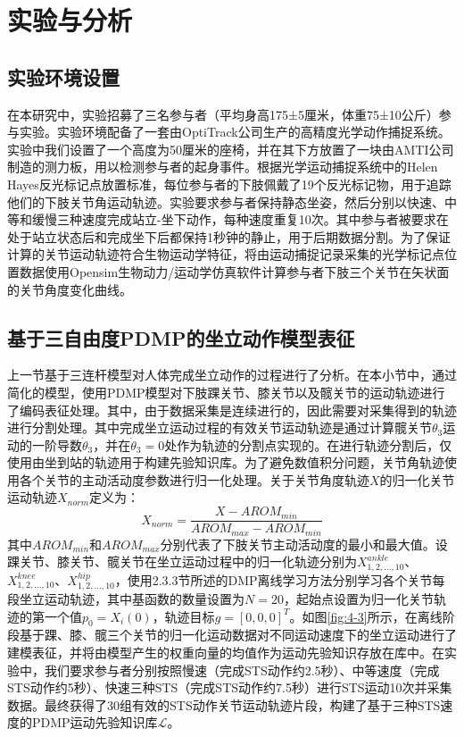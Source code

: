 \section{实验与分析}
\subsection{实验环境设置} 
在本研究中，实验招募了三名参与者（平均身高175±5厘米，体重75±10公斤）参与实验。实验环境配备了一套由OptiTrack公司生产的高精度光学动作捕捉系统。实验中我们设置了一个高度为50厘米的座椅，并在其下方放置了一块由AMTI公司制造的测力板，用以检测参与者的起身事件。根据光学运动捕捉系统中的Helen Hayes反光标记点放置标准，每位参与者的下肢佩戴了19个反光标记物，用于追踪他们的下肢关节角运动轨迹。实验要求参与者保持静态坐姿，然后分别以快速、中等和缓慢三种速度完成站立-坐下动作，每种速度重复10次。其中参与者被要求在处于站立状态后和完成坐下后都保持1秒钟的静止，用于后期数据分割。为了保证计算的关节运动轨迹符合生物运动学特征，将由运动捕捉记录采集的光学标记点位置数据使用Opensim生物动力/运动学仿真软件计算参与者下肢三个关节在矢状面的关节角度变化曲线。

\subsection{基于三自由度PDMP的坐立动作模型表征} 
上一节基于三连杆模型对人体完成坐立动作的过程进行了分析。在本小节中，通过简化的模型，使用PDMP模型对下肢踝关节、膝关节以及髋关节的运动轨迹进行了编码表征处理。其中，由于数据采集是连续进行的，因此需要对采集得到的轨迹进行分割处理。其中完成坐立运动过程的有效关节运动轨迹是通过计算髋关节$\theta_3$运动的一阶导数$\dot\theta_3$，并在$\dot\theta_3=0$处作为轨迹的分割点实现的。在进行轨迹分割后，仅使用由坐到站的轨迹用于构建先验知识库。为了避免数值积分问题，关节角轨迹使用各个关节的主动活动度参数进行归一化处理。关于关节角度轨迹$X$的归一化关节运动轨迹$X_{norm}$定义为：
\begin{equation}
    X_{norm} = \frac{X-AROM_{min}}{AROM_{max}-AROM_{min}}
    \label{eq:4-39}
\end{equation}
其中$AROM_{min}$和$AROM_{max}$分别代表了下肢关节主动活动度的最小和最大值。设踝关节、膝关节、髋关节在坐立运动过程中的归一化轨迹分别为$X_{1,2,...,10}^{ankle}$、$X_{1,2,...,10}^{knee}$、$X_{1,2,...,10}^{hip}$，使用2.3.3节所述的DMP离线学习方法分别学习各个关节每段坐立运动轨迹，其中基函数的数量设置为$N=20$，起始点设置为归一化关节轨迹的第一个值$p_0=X_i(0)$，轨迹目标$g=[0,0,0]^T$。如图\ref{fig:4-3}所示，在离线阶段基于踝、膝、髋三个关节的归一化运动数据对不同运动速度下的坐立运动进行了建模表征，并将由模型产生的权重向量的均值作为运动先验知识存放在库中。在实验中，我们要求参与者分别按照慢速（完成STS动作约2.5秒）、中等速度（完成STS动作约5秒）、快速三种STS（完成STS动作约7.5秒）进行STS运动10次并采集数据。最终获得了30组有效的STS动作关节运动轨迹片段，构建了基于三种STS速度的PDMP运动先验知识库$\mathscr{L}$。

